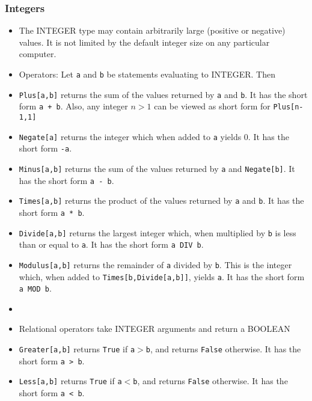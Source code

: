 \subsubsection{Integers}
\begin{itemize}
\item
The INTEGER type may contain arbitrarily large (positive or negative)
values.  It is not limited by the default integer size on any particular
computer.

\item
Operators:
Let \verb+a+ and \verb+b+ be statements evaluating to INTEGER. Then

\bd
\item
\verb+Plus[a,b]+ returns the sum of the values returned by
\verb+a+ and \verb+b+.  It has the short form \verb&a + b&.  Also,
any integer $n>1$ can be viewed as short form for \verb+Plus[n-1,1]+  
 
\item
\verb+Negate[a]+ returns the integer which when added to \verb+a+ yields
0.  It has the short form \verb&-a&.  
 
\item
\verb+Minus[a,b]+ returns the sum of the values returned by
\verb+a+ and \verb+Negate[b]+.  It has the short form \verb&a - b&.  

\item
\verb+Times[a,b]+ returns the product of the values returned by
\verb+a+ and \verb+b+.  It has the short form \verb+a * b+.

\item
\verb+Divide[a,b]+ returns the largest integer which, when
multiplied by \verb+b+ is less than or equal to \verb+a+.  It has the
short form \verb+a DIV b+.

\item
\verb+Modulus[a,b]+ returns the remainder of \verb+a+ divided by
\verb+b+.  This is the integer which, when added to
\verb+Times[b,Divide[a,b]]+, yields \verb+a+.  It has the short form 
\verb+a MOD b+.
\item

\ed
\item
Relational operators take INTEGER arguments and
return a BOOLEAN
\bd
\item
\verb+Greater[a,b]+ returns \verb+True+ if \verb+a+$>$\verb+b+, and
returns \verb+False+ otherwise.  It has the short form \verb+a > b+.

\item
\verb+Less[a,b]+ returns \verb+True+ if \verb+a+$<$\verb+b+, and
returns \verb+False+ otherwise.  It has the short form \verb+a < b+.


\end{itemize}
